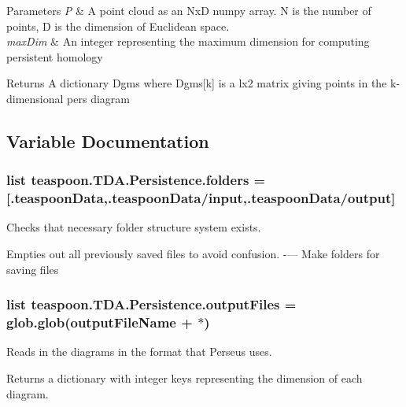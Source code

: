 \begin{DoxyParams}{Parameters}
{\em P} & A point cloud as an NxD numpy array. N is the number of points, D is the dimension of Euclidean space. \\
\hline
{\em max\+Dim} & An integer representing the maximum dimension for computing persistent homology\\
\hline
\end{DoxyParams}
\begin{DoxyReturn}{Returns}
A dictionary Dgms where Dgms\mbox{[}k\mbox{]} is a lx2 matrix giving points in the k-\/dimensional pers diagram 
\end{DoxyReturn}


\subsection{Variable Documentation}
\subsubsection[{\texorpdfstring{folders}{folders}}]{\setlength{\rightskip}{0pt plus 5cm}list teaspoon.\+T\+D\+A.\+Persistence.\+folders = \mbox{[}\textquotesingle{}.teaspoon\+Data\textquotesingle{},\textquotesingle{}.teaspoon\+Data/input\textquotesingle{},\textquotesingle{}.teaspoon\+Data/output\textquotesingle{}\mbox{]}}\hypertarget{namespaceteaspoon_1_1_t_d_a_1_1_persistence_a5d89c08933153d3fea60fd71e9e16800}{}\label{namespaceteaspoon_1_1_t_d_a_1_1_persistence_a5d89c08933153d3fea60fd71e9e16800}


Checks that necessary folder structure system exists. 

Empties out all previously saved files to avoid confusion. -\/--- Make folders for saving files 
\subsubsection[{\texorpdfstring{output\+Files}{outputFiles}}]{\setlength{\rightskip}{0pt plus 5cm}list teaspoon.\+T\+D\+A.\+Persistence.\+output\+Files = glob.\+glob(output\+File\+Name + \textquotesingle{}$\ast$\textquotesingle{})}\hypertarget{namespaceteaspoon_1_1_t_d_a_1_1_persistence_ae41c85513e98b32d96c75124929c4d2c}{}\label{namespaceteaspoon_1_1_t_d_a_1_1_persistence_ae41c85513e98b32d96c75124929c4d2c}


Reads in the diagrams in the format that Perseus uses. 

Returns a dictionary with integer keys representing the dimension of each diagram. 